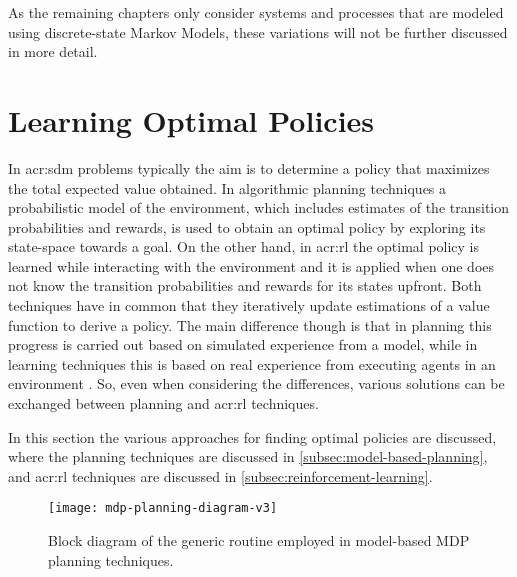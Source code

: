 As the remaining chapters only consider systems and processes that are modeled using discrete-state Markov Models, these variations will not be further discussed in more detail.

\section{Learning Optimal Policies}
\label{sec:planning}

In \acrshort{acr:sdm} problems typically the aim is to determine a policy that maximizes the total expected value obtained.
In algorithmic planning techniques a probabilistic model of the environment, which includes estimates of the transition probabilities and rewards, is used to obtain an optimal policy by exploring its state-space towards a goal.
On the other hand, in \acrfull{acr:rl} the optimal policy is learned while interacting with the environment and it is applied when one does not know the transition probabilities and rewards for its states upfront.
Both techniques have in common that they iteratively update estimations of a value function to derive a policy.
The main difference though is that in planning this progress is carried out based on simulated experience from a model, while in learning techniques this is based on real experience from executing agents in an environment \cite{sutton1998reinforcement}.
So, even when considering the differences, various solutions can be exchanged between planning and \acrshort{acr:rl} techniques.

In this section the various approaches for finding optimal policies are discussed, where the planning techniques are discussed in \autoref{subsec:model-based-planning}, and \acrshort{acr:rl} techniques are discussed in \autoref{subsec:reinforcement-learning}.


\begin{figure}[t!]
	\centering
	\texttt{[image: mdp-planning-diagram-v3]}
	\caption{Block diagram of the generic routine employed in model-based MDP planning techniques.}
	\label{fig:model-based-routine}
\end{figure}


